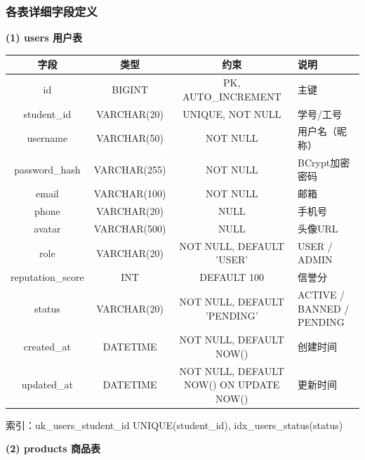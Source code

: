 \documentclass[12pt,a4paper]{ctexart}
\numberwithin{figure}{section}
\numberwithin{table}{section}
\begin{document}
\subsubsection{各表详细字段定义}

\textbf{(1) users 用户表}

\begin{center}
\renewcommand{\arraystretch}{1.3}
\small
\begin{tabular}{|c|c|c|p{6cm}|}
\hline
\rowcolor{tableheader}
\textbf{字段} & \textbf{类型} & \textbf{约束} & \textbf{说明} \\
\hline
id & BIGINT & PK, AUTO\_INCREMENT & 主键 \\
\hline
student\_id & VARCHAR(20) & UNIQUE, NOT NULL & 学号/工号 \\
\hline
username & VARCHAR(50) & NOT NULL & 用户名（昵称） \\
\hline
password\_hash & VARCHAR(255) & NOT NULL & BCrypt加密密码 \\
\hline
email & VARCHAR(100) & NOT NULL & 邮箱 \\
\hline
phone & VARCHAR(20) & NULL & 手机号 \\
\hline
avatar & VARCHAR(500) & NULL & 头像URL \\
\hline
role & VARCHAR(20) & NOT NULL, DEFAULT 'USER' & USER / ADMIN \\
\hline
reputation\_score & INT & DEFAULT 100 & 信誉分 \\
\hline
status & VARCHAR(20) & NOT NULL, DEFAULT 'PENDING' & ACTIVE / BANNED / PENDING \\
\hline
created\_at & DATETIME & NOT NULL, DEFAULT NOW() & 创建时间 \\
\hline
updated\_at & DATETIME & NOT NULL, DEFAULT NOW() ON UPDATE NOW() & 更新时间 \\
\hline
\end{tabular}
\end{center}

索引：uk\_users\_student\_id UNIQUE(student\_id), idx\_users\_status(status)

\textbf{(2) products 商品表}
\end{document}
